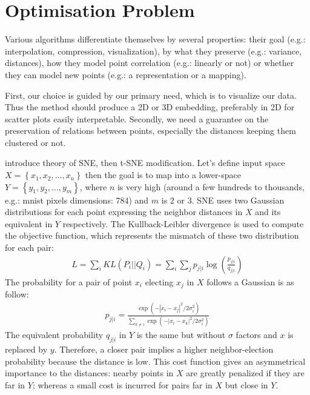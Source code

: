 \documentclass[a4paper,12pt]{report}
\newcommand{\eg}{e.g.}
\begin{document}
\section{Optimisation Problem}
Various algorithms differentiate themselves by several properties: their goal (\eg: interpolation, compression, visualization), by what they preserve (\eg: variance, distances), how they model point correlation (\eg: linearly or not) or whether they can model new points (\eg: a representation or a mapping).

First, our choice is guided by our primary need, which is to visualize our data.
Thus the method should produce a 2D or 3D embedding, preferably in 2D for scatter plots easily interpretable.
Secondly, we need a guarantee on the preservation of relations between points, especially the distances keeping them clustered or not.

introduce theory of SNE, then t-SNE modification.
Let's define input space $X = \left\{ x_1, x_2, \dots, x_n \right\}$ then the goal is to map into a lower-space $Y = \left\{ y_1, y_2, \dots, y_m \right\}$, where $n$ is very high (around a few hundreds to thousands, \eg: mnist pixels dimensions: 784) and $m$ is $2$ or $3$.
SNE uses two Gaussian distributions for each point expressing the neighbor distances in $X$ and its equivalent in $Y$ respectively.
The Kullback-Leibler divergence is used to compute the objective function, which represents the mismatch of these two distribution for each pair:
\begin{eqnarray}
    L = \sum_i KL(P_i || Q_i) = \sum_i \sum_j p_{j|i} \log\left(\frac{p_{j|i}}{q_{j|i}}\right)
\end{eqnarray}
The probability for a pair of point $x_i$ electing $x_j$ in $X$ follows a Gaussian is as follow:
\begin{eqnarray}
    p_{j|i} = \frac{\exp(-|x_i - x_j|^2 / 2 \sigma_i^2)}{\sum_{k \not = i} \exp(-|x_i - x_k|^2 / 2 \sigma_i^2 )}
\end{eqnarray}
The equivalent probability $q_{j|i}$ in $Y$ is the same but without $\sigma$ factors and $x$ is replaced by $y$.
Therefore, a closer pair implies a higher neighbor-election probability because the distance is low.
This cost function gives an asymmetrical importance to the distances: nearby points in $X$ are greatly penalized if they are far in $Y$; whereas a small cost is incurred for pairs far in $X$ but close in $Y$.
\end{document}
